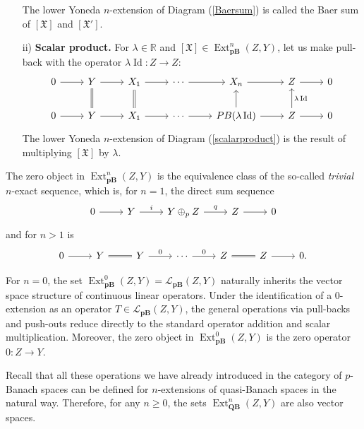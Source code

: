 \documentclass[12pt,a4paper]{amsproc}
\theoremstyle{remark}
\theoremstyle{definition}
\newcommand{\Ext}{\operatorname{Ext}}
\newcommand{\QBan}{\operatorname{\textbf{QB}}}
\newcommand{\pBan}{\operatorname{\textbf{pB}}}
\newcommand{\Id}{\operatorname{Id}}
\numberwithin{equation}{section}
\begin{document}
\begin{itemize}
        The lower Yoneda $n$-extension of Diagram (\ref{Baersum}) is called the Baer sum of $[\mathfrak{X}]$ and $[\mathfrak{X}']$.
        \item[ii)] \textbf{Scalar product.} For $\lambda \in \mathbb R$ and $[\mathfrak{X}] \in \Ext^n_{\pBan}(Z,Y)$, let us make pull-back with the operator $\lambda\Id:Z \to Z$:
        \begin{equation}
            \label{scalarproduct}
            \begin{tikzcd}
0 \arrow[r] & Y \arrow[r] \arrow[d, equal] & X_1 \arrow[r] \arrow[d, equal] & \cdots \arrow[r] & X_n \arrow[r]                       & Z \arrow[r]                          & 0 \\
0 \arrow[r] & Y \arrow[r]                                & X_1 \arrow[r]                                & \cdots \arrow[r] & PB(\lambda \Id) \arrow[u] \arrow[r] & Z \arrow[u, "\lambda\Id"'] \arrow[r] & 0
\end{tikzcd}
        \end{equation}
        The lower Yoneda $n$-extension of Diagram (\ref{scalarproduct}) is the result of multiplying $[\mathfrak{X}]$ by $\lambda$.
    \end{itemize}

The zero object in $\Ext^n_{\pBan}(Z,Y)$ is the equivalence class of the so-called \emph{trivial} $n$-exact sequence, which is, for $n=1$, the direct sum sequence 
	\[ \begin{tikzcd}
		0 \arrow[r] & Y \arrow[r, "i"] & Y \oplus_p Z \arrow[r, "q"] & Z \arrow[r] & 0
	\end{tikzcd}\]
	and for $n>1$ is 
	\begin{equation}
		\notag
		\begin{tikzcd}
			0 \arrow[r] & Y \arrow[r, equal] & Y \arrow[r, "0"] & \cdots \arrow[r, "0"] & Z \arrow[r, equal] & Z \arrow[r] & 0.
		\end{tikzcd}
	\end{equation}
    \par For $n = 0$, the set $\Ext^0_{\boldsymbol{\pBan}}(Z,Y) = \mathcal{L}_{\pBan}(Z,Y)$ naturally inherits the vector space structure of continuous linear operators. Under the identification of a $0$-extension as an operator $T \in \mathcal{L}_{\pBan}(Z,Y)$, the general operations via pull-backs and push-outs reduce directly to the standard operator addition and scalar multiplication. Moreover, the zero object in $\Ext^0_{\boldsymbol{\pBan}}(Z,Y)$ is the zero operator $0: Z \to Y$.
    \par Recall that all these operations we have already introduced in the category of $p$-Banach spaces can be defined for $n$-extensions of quasi-Banach spaces in the natural way. Therefore, for any $n\geq 0$, the sets $\Ext^n_{\QBan}(Z,Y)$ are also vector spaces.
\end{document}
